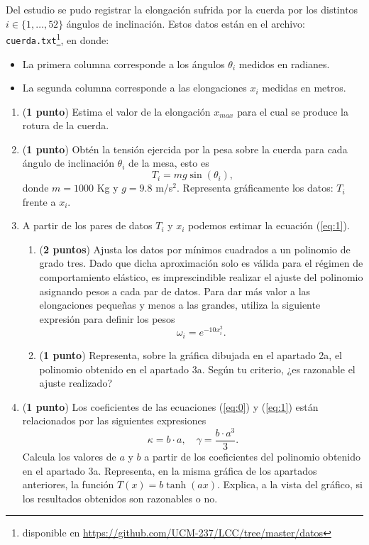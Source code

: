 \begin{paracol}{2}
Del estudio se pudo registrar la elongación sufrida por la cuerda por los distintos $i\in\{1,\dots,52\}$ ángulos de inclinación. Estos datos están en el archivo:  \texttt{cuerda.txt}\footnote{disponible en \url{https://github.com/UCM-237/LCC/tree/master/datos}}, en donde:
\begin{itemize}
	\item La primera columna corresponde a los ángulos $\theta_i$ medidos en radianes.
	\item La segunda columna corresponde a las elongaciones $x_i$ medidas en metros.
\end{itemize}

\begin{enumerate}
\item (\textbf{1 punto}) Estima el valor de la elongación $x_{max}$ para el cual se produce la rotura de la cuerda.

\item (\textbf{1 punto}) Obtén la tensión ejercida por la pesa sobre la cuerda para cada ángulo de inclinación $\theta_i$ de la mesa, esto es
\begin{equation} \label{eq:2}
T_i = mg\sin(\theta_i),
\end{equation}
donde $m =1000$ Kg y $g = 9.8$ m/s$^2$. Representa gráficamente los datos: $T_i$ frente a $x_i$.

\item A partir de los pares de datos $T_i$ y $x_i$ podemos estimar la ecuación (\ref{eq:1}).
\begin{enumerate}
\item (\textbf{2 puntos}) Ajusta los datos por mínimos cuadrados a un polinomio de grado tres. Dado que dicha aproximación solo es válida para el régimen de comportamiento elástico, es imprescindible realizar el ajuste del polinomio asignando pesos a cada par de datos. Para dar más valor a las elongaciones pequeñas y menos a las grandes, utiliza la siguiente expresión para definir los pesos
\begin{equation}
\omega_i = e^{-10x_i^2}.
\end{equation}
\item (\textbf{1 punto})  Representa, sobre la gráfica dibujada en el apartado 2a, el polinomio obtenido en el apartado 3a. Según tu criterio, ¿es razonable el ajuste realizado?
\end{enumerate}

\item (\textbf{1 punto})  Los coeficientes de las ecuaciones (\ref{eq:0}) y (\ref{eq:1}) están relacionados por las siguientes expresiones
\begin{equation}
\kappa = b\cdot a, \quad \gamma = \frac{b\cdot a^3}{3}. \nonumber
\end{equation}
		Calcula los valores de $a$ y $b$ a partir de los coeficientes del polinomio obtenido en el apartado 3a. Representa, en la misma gráfica de los apartados anteriores, la función $T(x) = b\tanh(ax)$. Explica, a la vista del gráfico, si los resultados obtenidos son razonables o no. 


\end{enumerate}
\end{paracol}
